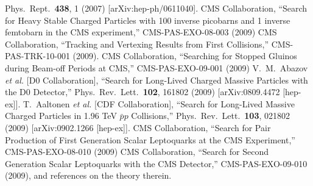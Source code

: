 \documentclass{cmspaper}
\begin{document}
\begin{thebibliography}{0}
  Phys.\ Rept.\  {\bf 438}, 1 (2007)
  [arXiv:hep-ph/0611040].
 CMS Collaboration,
 ``Search for Heavy Stable Charged Particles with 100 inverse picobarns and 1 inverse femtobarn in the CMS experiment,''
 CMS-PAS-EXO-08-003 (2009)
 CMS Collaboration,
 ``Tracking and Vertexing Results from First Collisions,''
 CMS-PAS-TRK-10-001 (2009).
  CMS Collaboration,
  ``Searching for Stopped Gluinos during Beam-off Periods at CMS,''
  CMS-PAS-EXO-09-001 (2009)
  V.~M.~Abazov {\it et al.}  [D0 Collaboration],
  ``Search for Long-Lived Charged Massive Particles with the D0 Detector,''
  Phys.\ Rev.\ Lett.\  {\bf 102}, 161802 (2009)
  [arXiv:0809.4472 [hep-ex]].
\quad
  T.~Aaltonen {\it et al.}  [CDF Collaboration],
  ``Search for Long-Lived Massive Charged Particles in 1.96 TeV $\bar{p}p$ Collisions,''
  Phys.\ Rev.\ Lett.\  {\bf 103}, 021802 (2009)
  [arXiv:0902.1266 [hep-ex]].
  CMS Collaboration,
  ``Search for Pair Production of First Generation Scalar Leptoquarks at the CMS Experiment,''
  CMS-PAS-EXO-08-010 (2009)
\quad 
  CMS Collaboration,
  ``Search for Second Generation Scalar Leptoquarks with the CMS Detector,''
  CMS-PAS-EXO-09-010 (2009), and references on the theory therein.
\end{thebibliography}


%
%

\end{document}
